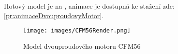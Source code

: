 {Hotový model je na , animace je dostupná ke stažení zde: \ref{pr:animaceDvouproudovyMotor}.}

\begin{figure}[H]
    \centering
    \texttt{[image: images/CFM56Render.png]}
    \caption{Model dvouproudového motoru CFM56 \jaObr}
    \label{obr:CFM56Render}
\end{figure}